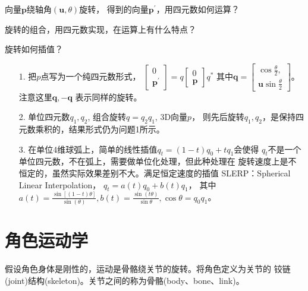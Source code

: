 \documentclass[lang=cn,newtx,10pt,scheme=chinese]{elegantbook}
\begin{document}
\begin{problemset}
  \item 向量$\boldsymbol{p}$绕轴角$(\boldsymbol{u}, \theta)$旋转，
  得到的向量$\boldsymbol{p}^{\prime}$，用四元数如何运算？
  \item 旋转的组合，用四元数实现，在运算上有什么特点？
  \item 旋转如何插值？
\end{problemset}

\begin{solution}
  \begin{enumerate}
    \item[1.] 把$p$点写为一个纯四元数形式，
    $
    \left[\begin{array}{l}
      0 \\
      \boldsymbol{p}^{\prime}
    \end{array}\right] = 
    q \left[\begin{array}{l}
      0 \\
      \boldsymbol{p}
      \end{array}\right] q^{*}
    $
    其中$\boldsymbol{q}=\left[\begin{array}{l}
      \cos\frac{\theta}{2}, \\
      \boldsymbol{u}\sin\frac{\theta}{2} 
      \end{array}\right]$。注意这里$\boldsymbol{q},\boldsymbol{-q}$
      表示同样的旋转。
    \item[2.] 单位四元数$q_1, q_2$, 组合旋转$q=q_2 q_1$, 3D向量$p$，
    则先后旋转$q_1, q_2$，是保持四元数乘积的，结果形式仍为问题1所示。
  \item[3.] 在单位4维球弧上，简单的线性插值$q_t = (1-t)q_0 + tq_1$会使得
   $q_t$不是一个单位四元数，不在弧上，需要做单位化处理，但此种处理在
  旋转速度上是不恒定的，虽然实际效果差别不大。满足恒定速度的插值
  SLERP：Spherical Linear Interpolation， $q_t = a(t)q_0 + b(t)q_1$，
  其中$a(t)=\frac{\sin[(1-t)\theta]}{\sin(\theta)}, b(t)=\frac{\sin(t\theta)}{\sin\theta}, 
  \cos\theta=q_0 q_1 $。
  \end{enumerate}
  
\end{solution}

\chapter{角色运动学}
假设角色身体是刚性的，运动是骨骼绕关节的旋转。将角色定义为关节的
铰链(joint)结构(skeleton)。关节之间的称为骨骼(body、bone、link)。
\end{document}
